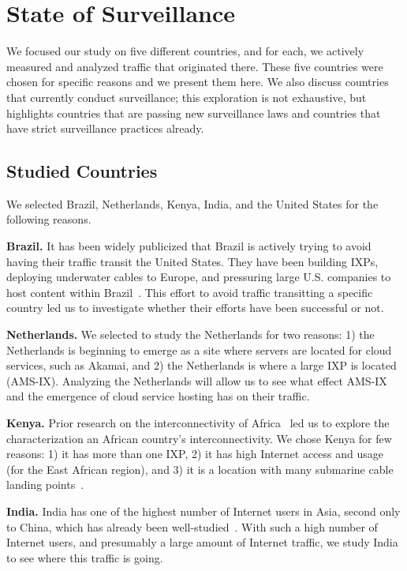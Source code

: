 \section{State of Surveillance}
\label{surv}
We focused our study on five different countries, and for each, we actively measured and analyzed traffic that originated there.  These five countries were chosen for specific reasons and we present them here.  We also discuss countries that currently conduct surveillance; this exploration is not exhaustive, but highlights countries that are passing new surveillance laws and countries that have strict surveillance practices already.   

\subsection{Studied Countries}
We selected Brazil, Netherlands, Kenya, India, and the United States for the following reasons.

{\bf Brazil.} It has been widely publicized that Brazil is actively trying to avoid having their traffic transit the United States.  They have been building IXPs, deploying underwater cables to Europe, and pressuring large U.S. companies to host content within Brazil~\cite{brazil_history, brazil_break_from_US, brazil_conference,
  brazil_conference2, brazil_human_rights, brazil_cable, brazil_us_companies, brazil_IXP1}.  This effort to avoid traffic transitting a specific country led us to investigate whether their efforts have been successful or not.

{\bf Netherlands.}  We selected to study the Netherlands for two reasons: 1) the Netherlands is beginning to emerge as a site where servers are located for cloud services, such as Akamai, and 2) the Netherlands is where a large IXP is located (AMS-IX). Analyzing the Netherlands will allow us to see what effect AMS-IX and the emergence of cloud service hosting has on their traffic.

{\bf Kenya.} Prior research on the interconnectivity of Africa~\cite{gupta2014peering, fanou2015diversity} led us to explore the characterization an African country's interconnectivity.  We chose Kenya for few reasons: 1) it has more than one IXP, 2) it has high Internet access and usage (for the East African region), and 3) it is a location with many submarine cable landing points~\cite{kenya_nigeria, teams}.

{\bf India.}  India has one of the highest number of Internet users in Asia, second only to China, which has already been well-studied~\cite{tsui2003panopticon, wang2010discourse}.  With such a high number of Internet users, and presumably a large amount of Internet traffic, we study India to see where this traffic is going.

